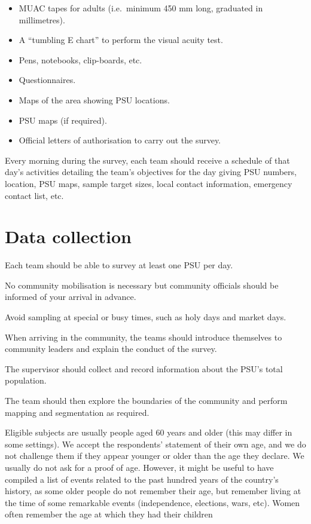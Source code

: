 \documentclass[12pt,a4paper]{book}
\providecommand{\tightlist}{%
  \setlength{\itemsep}{0pt}\setlength{\parskip}{0pt}}
\begin{document}
\begin{itemize}
\tightlist
\item
  MUAC tapes for adults (i.e.~minimum 450 mm long, graduated in millimetres).
\item
  A ``tumbling E chart'' to perform the visual acuity test.
\item
  Pens, notebooks, clip-boards, etc.
\item
  Questionnaires.
\item
  Maps of the area showing PSU locations.
\item
  PSU maps (if required).
\item
  Official letters of authorisation to carry out the survey.
\end{itemize}

Every morning during the survey, each team should receive a schedule of that day's activities detailing the team's objectives for the day giving PSU numbers, location, PSU maps, sample target sizes, local contact information, emergency contact list, etc.

\hypertarget{data-collection}{%
\section{Data collection}\label{data-collection}}

Each team should be able to survey at least one PSU per day.

No community mobilisation is necessary but community officials should be informed of your arrival in advance.

Avoid sampling at special or busy times, such as holy days and market days.

When arriving in the community, the teams should introduce themselves to community leaders and explain the conduct of the survey.

The supervisor should collect and record information about the PSU's total population.

The team should then explore the boundaries of the community and perform mapping and segmentation as required.

Eligible subjects are usually people aged 60 years and older (this may differ in some settings). We accept the respondents' statement of their own age, and we do not challenge them if they appear younger or older than the age they declare. We usually do not ask for a proof of age. However, it might be useful to have compiled a list of events related to the past hundred years of the country's history, as some older people do not remember their age, but remember living at the time of some remarkable events (independence, elections, wars, etc). Women often remember the age at which they had their children
\end{document}
